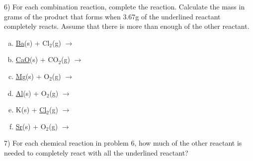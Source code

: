\documentclass[12pt]{article}
\begin{document}
6) For each combination reaction, complete the reaction.
Calculate the mass in grams of the product
that forms when 3.67g of the underlined reactant completely reacts.
Assume that there is more than enough of the other reactant.

\begin{enumerate}[(a)]
\item \underline{Ba}(s) + Cl$_2$(g) $\rightarrow$ %
\item \underline{CaO}(s) + CO$_2$(g) $\rightarrow$ %
\item \underline{Mg}(s) + O$_2$(g) $\rightarrow$ %
\item \underline{Al}(s) + O$_2$(g) $\rightarrow$ %
\item K(s) + \underline{Cl$_2$}(g) $\rightarrow$ %
\item \underline{Sr}(s) + O$_2$(g) $\rightarrow$ %
\end{enumerate}

7) For each chemical reaction in problem 6, how much of the other
reactant is needed to completely react with all the underlined
reactant?
  
\end{document}
